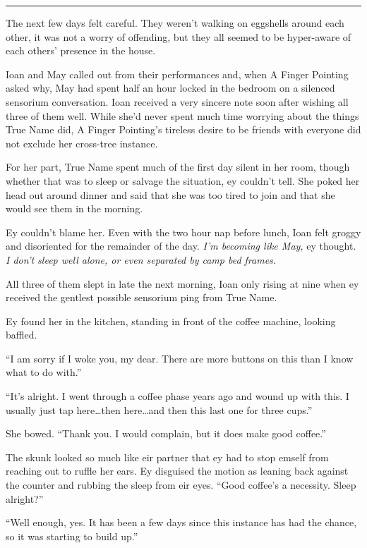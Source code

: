 \begin{center}\rule{0.5\linewidth}{0.5pt}\end{center}

The next few days felt careful. They weren't walking on eggshells around each other, it was not a worry of offending, but they all seemed to be hyper-aware of each others' presence in the house.

Ioan and May called out from their performances and, when A Finger Pointing asked why, May had spent half an hour locked in the bedroom on a silenced sensorium conversation. Ioan received a very sincere note soon after wishing all three of them well. While she'd never spent much time worrying about the things True Name did, A Finger Pointing's tireless desire to be friends with everyone did not exclude her cross-tree instance.

For her part, True Name spent much of the first day silent in her room, though whether that was to sleep or salvage the situation, ey couldn't tell. She poked her head out around dinner and said that she was too tired to join and that she would see them in the morning.

Ey couldn't blame her. Even with the two hour nap before lunch, Ioan felt groggy and disoriented for the remainder of the day. \emph{I'm becoming like May,} ey thought. \emph{I don't sleep well alone, or even separated by camp bed frames.}

All three of them slept in late the next morning, Ioan only rising at nine when ey received the gentlest possible sensorium ping from True Name.

Ey found her in the kitchen, standing in front of the coffee machine, looking baffled.

``I am sorry if I woke you, my dear. There are more buttons on this than I know what to do with.''

``It's alright. I went through a coffee phase years ago and wound up with this. I usually just tap here\ldots then here\ldots and then this last one for three cups.''

She bowed. ``Thank you. I would complain, but it does make good coffee.''

The skunk looked so much like eir partner that ey had to stop emself from reaching out to ruffle her ears. Ey disguised the motion as leaning back against the counter and rubbing the sleep from eir eyes. ``Good coffee's a necessity. Sleep alright?''

``Well enough, yes. It has been a few days since this instance has had the chance, so it was starting to build up.''

